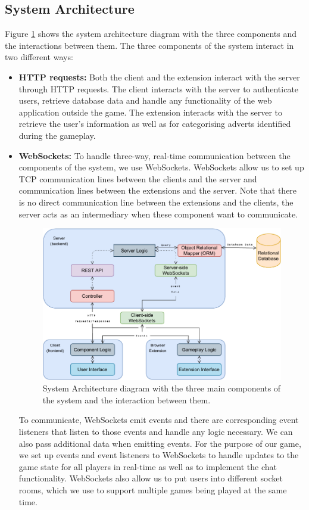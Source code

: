 \documentclass{l4proj}
\begin{document}
\subsection{System Architecture}
Figure \ref{fig:sysarch} shows the system architecture diagram with the three components and the interactions between them. The three components of the system interact in two different ways:
\begin{itemize}
   \item
   \textbf{HTTP requests:} Both the client and the extension interact with the server through HTTP requests. The client interacts with the server to authenticate users, retrieve database data and handle any functionality of the web application outside the game. The extension interacts with the server to retrieve the user's information as well as for categorising adverts identified during the gameplay.
   \item
   \textbf{WebSockets:} To handle three-way, real-time communication between the components of the system, we use WebSockets. WebSockets allow us to set up TCP communication lines between the clients and the server and communication lines between the extensions and the server. Note that there is no direct communication line between the extensions and the clients, the server acts as an intermediary when these component want to communicate. 

\begin{figure}
    \centering
    \includegraphics[width=1\linewidth]{images/sys_arch.pdf}    

    \caption{System Architecture diagram with the three main components of the system and the interaction between them.}

    \label{fig:sysarch} 
\end{figure}


To communicate, WebSockets emit events and there are corresponding event listeners that listen to those events and handle any logic necessary. We can also pass additional data when emitting events. For the purpose of our game, we set up events and event listeners to WebSockets to handle updates to the game state for all players in real-time as well as to implement the chat functionality. WebSockets also allow us to put users into different socket rooms, which we use to support multiple games being played at the same time.
\end{itemize}
\end{document}
